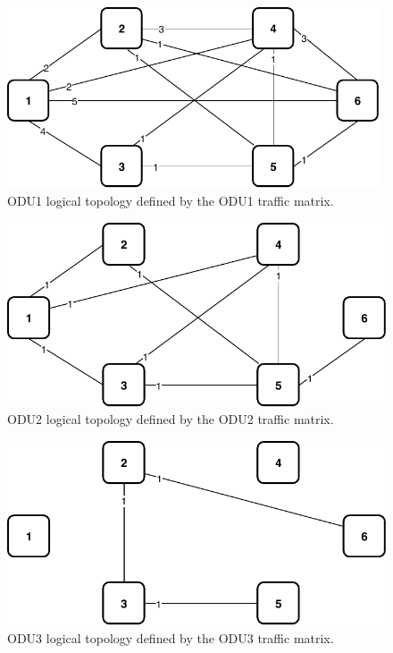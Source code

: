 \begin{figure}[h!]
\centering
\includegraphics[width=11cm]{sdf/ilp/opaque_protection/figures/logical_topology_ODU1_low}
\caption{ODU1 logical topology defined by the ODU1 traffic matrix.}
\label{logical_ODU1_protectionlow}
\end{figure}
\newpage
\begin{figure}[h!]
\centering
\includegraphics[width=12cm]{sdf/ilp/opaque_protection/figures/logical_topology_ODU2_low}
\caption{ODU2 logical topology defined by the ODU2 traffic matrix.}
\label{logical_ODU2_protectionlow}
\end{figure}

\begin{figure}[h!]
\centering
\includegraphics[width=12cm]{sdf/ilp/opaque_protection/figures/logical_topology_ODU3_low}
\caption{ODU3 logical topology defined by the ODU3 traffic matrix.}
\label{logical_ODU3_protectionlow}
\end{figure}

